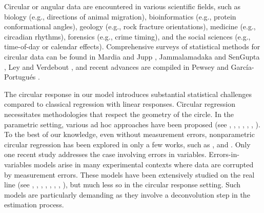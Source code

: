 \documentclass[11pt,a4paper,openany]{article}
\begin{document}
Circular or angular data are encountered in various scientific fields, such as biology (e.g., directions of animal migration), bioinformatics (e.g., protein conformational angles), geology (e.g., rock fracture orientations), medicine (e.g., circadian rhythms), forensics (e.g., crime timing), and the social sciences (e.g., time-of-day or calendar effects). Comprehensive surveys of statistical methods for circular data can be found in Mardia and Jupp \cite{book:Mardia-Jupp}, Jammalamadaka and SenGupta \cite{book:Jammalamadaka-SenGupta}, Ley and Verdebout \cite{book:Ley-Verdebout}, and recent advances are compiled in Pewsey and Garc\'ia-Portugu\'es \cite{Pewsey-GarciaPortuge}.

The circular response in our model introduces substantial statistical challenges compared to classical regression with linear responses. Circular regression necessitates methodologies that respect the geometry of the circle. In the parametric setting, various ad hoc approaches have been proposed (see \cite{Gould}, \cite{Johnson-Wehrly-1}, \cite{Johnson-Wehrly-2}, \cite{Fisher-Lee:1992}, \cite{Kato-Shimizu-Shieh}, \cite{Downs-Mardia}, \cite{Fernandez-Duran}). To the best of our knowledge, even without measurement errors, nonparametric circular regression has been explored in only a few works, such as \cite{Marzio-Panzera-Taylor}, \cite{Nguyen-PhamNgoc-Rivoirard} and \cite{Jeon-Park-Keilegom2021}. Only one recent study \cite{Di-Marzio-Fensore-Taylor} addresses the case involving errors in variables. Errors-in-variables models arise in many experimental contexts where data are corrupted by measurement errors. These models have been extensively studied on the real line (see \cite{Meister}, \cite{Comte-Taupin}, \cite{Koo-Lee}, \cite{Delaigle-Hall-Jamshidi}, \cite{Carroll-Delaigle-Hall}, \cite{Chesneau}, \cite{Jeon-Park-Keilegom2022}, \cite{Jeon-Park-Keilegom2024}), but much less so in the circular response setting. Such models are particularly demanding as they involve a deconvolution step in the estimation process.
\end{document}
